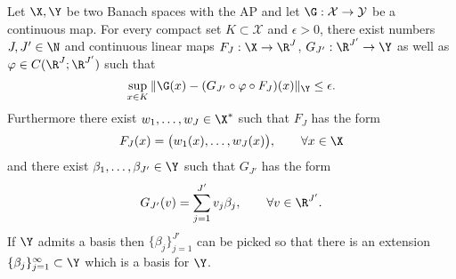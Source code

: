 \begin{lemma}
\label{lemma:finitedim_approx}
Let \(\X, \Y\) be two Banach spaces with the AP and let \(\G : \mathcal{X} \to \mathcal{Y}\) be a
continuous map. For every compact set \(K \subset \mathcal{X}\) and \(\epsilon > 0\), there exist numbers \(J,J' \in \N\)
and continuous linear maps \(F_J : \X \to \R^{J}\), \(G_{J'} : \R^{J'} \to \Y\) as well as  \(\varphi \in C(\R^{J};\R^{J'})\)
such that  
\[\sup_{x \in K} \|\G(x) - (G_{J'} \circ \varphi \circ F_J) (x) \|_{\Y} \leq \epsilon.\]
Furthermore there exist \(w_1,\dots,w_J \in \X^*\) such that \(F_J\) has the form
\[F_J(x) = \bigl ( w_1(x), \dots, w_{J}(x) \bigl ), \qquad \forall x \in \X\]
and there exist \(\beta_1,\dots,\beta_{J'} \in \Y\) such that \(G_{J'}\) has the form
\[G_{J'}(v) = \sum_{j=1}^{J'} v_j \beta_j, \qquad \forall v \in \R^{J'}.\]
If \(\Y\) admits a basis then \(\{\beta_j\}_{j=1}^{J'}\)
can be picked so that there is an extension \(\{\beta_j\}_{j=1}^\infty \subset \Y\) which is a basis for \(\Y\).
\end{lemma}
